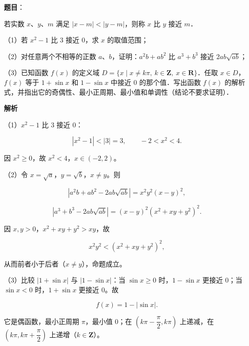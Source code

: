 \begin{answer}

\textbf{题目}：

若实数 $x$、$y$、$m$ 满足 $|x-m|<|y-m|$，则称 $x$ 比 $y$ 接近 $m$．

（1）若 $x^2-1$ 比 $3$ 接近 $0$，求 $x$ 的取值范围；

（2）对任意两个不相等的正数 $a$、$b$，证明：$a^2b+ab^2$ 比 $a^3+b^3$ 接近 $2ab\sqrt{ab}$；

（3）已知函数 $f(x)$ 的定义域 $D=\{x\mid x\neq k\pi,\ k\in\mathbf Z,\ x\in\mathbf R\}$．任取 $x\in D$，$f(x)$ 等于 $1+\sin x$ 和 $1-\sin x$ 中接近 $0$ 的那个值．写出函数 $f(x)$ 的解析式，并指出它的奇偶性、最小正周期、最小值和单调性（结论不要求证明）．

\textbf{解析}

（1）$x^2-1$ 比 $3$ 接近 $0$：

\nopagebreak[4]
\[|x^2-1|<|3|=3,\qquad -2<x^2<4.\]

因 $x^2\geqslant0$，故 $x^2<4$，$x\in(-2,2)$。

（2）令 $x=\sqrt a$，$y=\sqrt b$，$x\neq y$。则

\nopagebreak[4]
\[|a^2b+ab^2-2ab\sqrt{ab}|
=x^2y^2(x-y)^2,\]

\nopagebreak[4]
\[|a^3+b^3-2ab\sqrt{ab}|
=(x-y)^2(x^2+xy+y^2)^2.\]

因 $x,y>0$，$x^2+xy+y^2>xy$，故

\nopagebreak[4]
\[x^2y^2<(x^2+xy+y^2)^2,\]

从而前者小于后者（$x\neq y$），命题成立。

（3）比较 $|1+\sin x|$ 与 $|1-\sin x|$：当 $\sin x\geqslant0$ 时，$1-\sin x$ 更接近 $0$；当 $\sin x<0$ 时，$1+\sin x$ 更接近 $0$。故

\nopagebreak[4]
\[f(x)=1-|\sin x|.\]

它是偶函数，最小正周期 $\pi$，最小值 $0$；在 $\left(k\pi-\dfrac\pi2,k\pi\right)$ 上递减，在 $\left(k\pi,k\pi+\dfrac\pi2\right)$ 上递增（$k\in\mathbf Z$）。


\end{answer}
